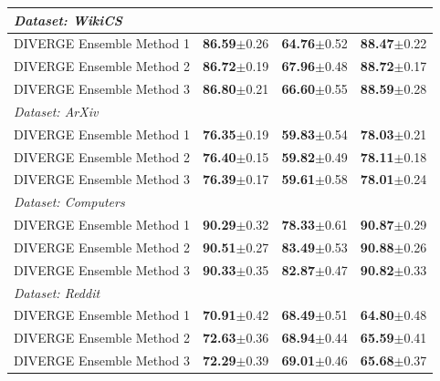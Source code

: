 \documentclass[a4paper,fleqn]{cas-sc}
\begin{document}
\begin{table}[htbp]
\begin{tabular*}{\textwidth}{@{\extracolsep{\fill}} lccc @{}}
\midrule
\multicolumn{4}{l}{\textit{Dataset: WikiCS}} \\
\midrule
DIVERGE Ensemble Method 1 & \textbf{86.59}{\scriptsize$\pm$0.26} & \textbf{64.76}{\scriptsize$\pm$0.52} & \textbf{88.47}{\scriptsize$\pm$0.22} \\
DIVERGE Ensemble Method 2 & \textbf{86.72}{\scriptsize$\pm$0.19} & \textbf{67.96}{\scriptsize$\pm$0.48} & \textbf{88.72}{\scriptsize$\pm$0.17} \\
DIVERGE Ensemble Method 3 & \textbf{86.80}{\scriptsize$\pm$0.21} & \textbf{66.60}{\scriptsize$\pm$0.55} & \textbf{88.59}{\scriptsize$\pm$0.28} \\
\midrule
\multicolumn{4}{l}{\textit{Dataset: ArXiv}} \\
\midrule
DIVERGE Ensemble Method 1 & \textbf{76.35}{\scriptsize$\pm$0.19} & \textbf{59.83}{\scriptsize$\pm$0.54} & \textbf{78.03}{\scriptsize$\pm$0.21} \\
DIVERGE Ensemble Method 2 & \textbf{76.40}{\scriptsize$\pm$0.15} & \textbf{59.82}{\scriptsize$\pm$0.49} & \textbf{78.11}{\scriptsize$\pm$0.18} \\
DIVERGE Ensemble Method 3 & \textbf{76.39}{\scriptsize$\pm$0.17} & \textbf{59.61}{\scriptsize$\pm$0.58} & \textbf{78.01}{\scriptsize$\pm$0.24} \\
\midrule
\multicolumn{4}{l}{\textit{Dataset: Computers}} \\
\midrule
DIVERGE Ensemble Method 1 & \textbf{90.29}{\scriptsize$\pm$0.32} & \textbf{78.33}{\scriptsize$\pm$0.61} & \textbf{90.87}{\scriptsize$\pm$0.29} \\
DIVERGE Ensemble Method 2 & \textbf{90.51}{\scriptsize$\pm$0.27} & \textbf{83.49}{\scriptsize$\pm$0.53} & \textbf{90.88}{\scriptsize$\pm$0.26} \\
DIVERGE Ensemble Method 3 & \textbf{90.33}{\scriptsize$\pm$0.35} & \textbf{82.87}{\scriptsize$\pm$0.47} & \textbf{90.82}{\scriptsize$\pm$0.33} \\
\midrule
\multicolumn{4}{l}{\textit{Dataset: Reddit}} \\
\midrule
DIVERGE Ensemble Method 1 & \textbf{70.91}{\scriptsize$\pm$0.42} & \textbf{68.49}{\scriptsize$\pm$0.51} & \textbf{64.80}{\scriptsize$\pm$0.48} \\
DIVERGE Ensemble Method 2 & \textbf{72.63}{\scriptsize$\pm$0.36} & \textbf{68.94}{\scriptsize$\pm$0.44} & \textbf{65.59}{\scriptsize$\pm$0.41} \\
DIVERGE Ensemble Method 3 & \textbf{72.29}{\scriptsize$\pm$0.39} & \textbf{69.01}{\scriptsize$\pm$0.46} & \textbf{65.68}{\scriptsize$\pm$0.37} \\
\bottomrule
\end{tabular*}
\end{table}
\end{document}
